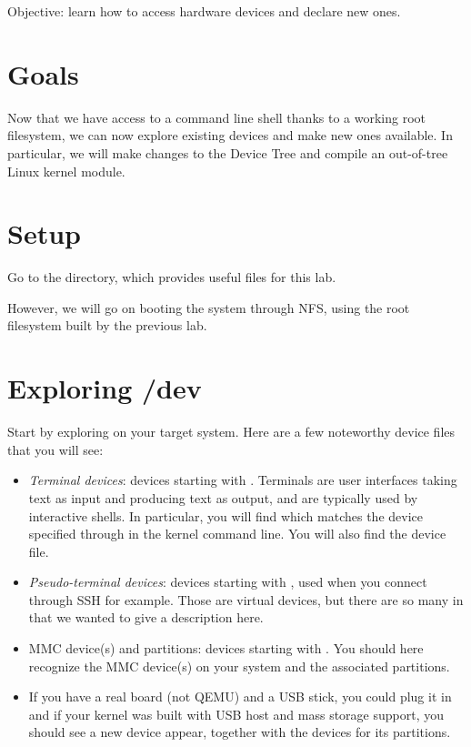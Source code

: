 {Objective: learn how to access hardware devices and declare new ones.}

\section{Goals}

Now that we have access to a command line shell thanks to a working root
filesystem, we can now explore existing devices and make new ones
available. In particular, we will make changes to the Device Tree
and compile an out-of-tree Linux kernel module.

\section{Setup}

Go to the  directory,
which provides useful files for this lab.

However, we will go on booting the system through NFS, using the
root filesystem built by the previous lab.

\section{Exploring /dev}

Start by exploring  on your target system. Here are a few
noteworthy device files that you will see:

\begin{itemize}
 \item {\em Terminal devices}: devices starting with .
       Terminals are user interfaces taking text as
       input and producing text as output, and are typically used by
       interactive shells. In particular, you will find
        which matches the device specified through
        in the kernel command line. You will also find
       the {\tt \ttyname} device file.
 \item {\em Pseudo-terminal devices}: devices starting with ,
       used when you connect through SSH for example. Those are virtual
       devices, but there are so many in  that we wanted
       to give a description here.
 \item {MMC device(s) and partitions}: devices starting with
       . You should here recognize the MMC device(s)
       on your system and the associated partitions.
 \item If you have a real board (not QEMU) and a USB stick, you could
       plug it in and if your kernel was built with USB host and mass
       storage support, you should see a new  device appear,
       together with the  devices for its partitions.
\end{itemize}

